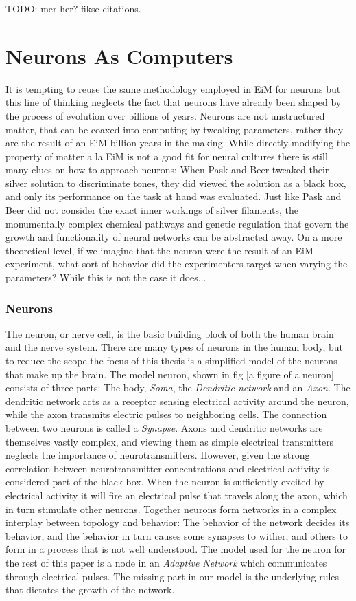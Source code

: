 TODO: mer her? fikse citations.
\section{Neurons As Computers}
It is tempting to reuse the same methodology employed in EiM for neurons but
this line of thinking neglects the fact that neurons have already been shaped by
the process of evolution over billions of years.
Neurons are not unstructured matter, that can be coaxed into computing by
tweaking parameters, rather they are the result of an EiM billion years in the
making.
While directly modifying the property of matter a la EiM is not a good fit for
neural cultures there is still many clues on how to approach neurons:
When Pask and Beer tweaked their silver solution to discriminate tones, they did
viewed the solution as a black box, and only its performance on the task at hand
was evaluated.
Just like Pask and Beer did not consider the exact inner workings of silver
filaments, the monumentally complex chemical pathways and genetic regulation
that govern the growth and functionality of neural networks can be abstracted
away.
On a more theoretical level, if we imagine that the neuron were the result of an
EiM experiment, what sort of behavior did the experimenters target when varying
the parameters?
While this is not the case it does...

\subsubsection{Neurons}
The neuron, or nerve cell, is the basic building block of both the human brain
and the nerve system.
There are many types of neurons in the human body, but to reduce the scope the
focus of this thesis is a simplified model of the neurons that make up the
brain.
The model neuron, shown in fig [a figure of a neuron] consists of three parts:
The body, \emph{Soma}, the \emph{Dendritic network} and an \emph{Axon}.
The dendritic network acts as a receptor sensing electrical activity around the
neuron, while the axon transmits electric pulses to neighboring cells.
The connection between two neurons is called a \emph{Synapse}.
Axons and dendritic networks are themselves vastly complex, and viewing them as
simple electrical transmitters neglects the importance of neurotransmitters.
However, given the strong correlation between neurotransmitter concentrations and
electrical activity is considered part of the black box.
When the neuron is sufficiently excited by electrical activity it will fire an
electrical pulse that travels along the axon, which in turn stimulate other
neurons.
Together neurons form networks in a complex interplay between topology and behavior:
The behavior of the network decides its behavior, and the behavior in turn
causes some synapses to wither, and others to form in a process that is not well
understood.
The model used for the neuron for the rest of this paper is a node in an
\emph{Adaptive Network} which communicates through electrical pulses.
The missing part in our model is the underlying rules that dictates the growth
of the network.

